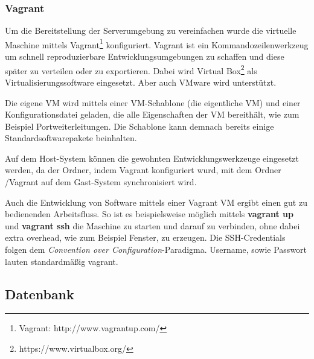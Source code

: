 \subsubsection{Vagrant \label{sec:Vagrant}}
\label{vagrant}
Um die Bereitstellung der Serverumgebung zu vereinfachen wurde die virtuelle Maschine mittels Vagrant\footnote{Vagrant: http://www.vagrantup.com/} konfiguriert. Vagrant ist ein Kommandozeilenwerkzeug um schnell reproduzierbare Entwicklungsumgebungen zu schaffen und diese später zu verteilen oder zu exportieren. Dabei wird Virtual Box\footnote{https://www.virtualbox.org/} als Virtualisierungssoftware eingesetzt. Aber auch VMware wird unterstützt. 

Die eigene VM wird mittels einer VM-Schablone (die eigentliche VM) und einer Konfigurationsdatei geladen, die alle Eigenschaften der VM bereithält, wie zum Beispiel Portweiterleitungen. Die Schablone kann demnach bereits einige Standardsoftwarepakete beinhalten. 

Auf dem Host-System können die gewohnten Entwicklungswerkzeuge eingesetzt werden, da der Ordner, indem Vagrant konfiguriert wurd, mit dem Ordner /Vagrant auf dem Gast-System synchronisiert wird. 

Auch die Entwicklung von Software mittels einer Vagrant VM ergibt einen gut zu bedienenden Arbeitsfluss. So ist es beispielsweise möglich mittels \textbf{vagrant up} und \textbf{vagrant ssh} die Maschine zu starten und darauf zu verbinden, ohne dabei extra overhead, wie zum Beispiel Fenster, zu erzeugen. Die SSH-Credentials folgen dem \textit{Convention over Configuration}-Paradigma. Username, sowie Passwort lauten standardmäßig vagrant. 

\subsection{Datenbank}

